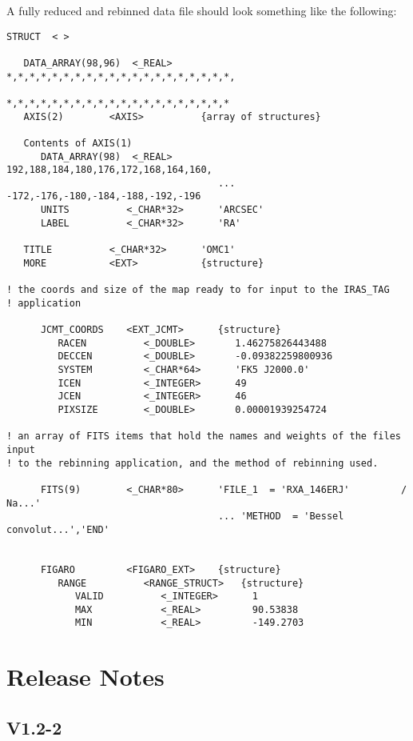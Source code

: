 \documentclass[twoside,11pt]{article}
\renewcommand{\_}{\texttt{\symbol{95}}}
\begin{document}
\goodbreak

A fully reduced and rebinned data file should look something like the
following:

\begin{small}
\begin{verbatim}
STRUCT  < >

   DATA_ARRAY(98,96)  <_REAL>     *,*,*,*,*,*,*,*,*,*,*,*,*,*,*,*,*,*,*,*,
                                  *,*,*,*,*,*,*,*,*,*,*,*,*,*,*,*,*,*,*,*
   AXIS(2)        <AXIS>          {array of structures}

   Contents of AXIS(1)
      DATA_ARRAY(98)  <_REAL>        192,188,184,180,176,172,168,164,160,
                                     ... -172,-176,-180,-184,-188,-192,-196
      UNITS          <_CHAR*32>      'ARCSEC'
      LABEL          <_CHAR*32>      'RA'

   TITLE          <_CHAR*32>      'OMC1'
   MORE           <EXT>           {structure}

! the coords and size of the map ready to for input to the IRAS_TAG
! application

      JCMT_COORDS    <EXT_JCMT>      {structure}
         RACEN          <_DOUBLE>       1.46275826443488
         DECCEN         <_DOUBLE>       -0.09382259800936
         SYSTEM         <_CHAR*64>      'FK5 J2000.0'
         ICEN           <_INTEGER>      49
         JCEN           <_INTEGER>      46
         PIXSIZE        <_DOUBLE>       0.00001939254724

! an array of FITS items that hold the names and weights of the files input 
! to the rebinning application, and the method of rebinning used.

      FITS(9)        <_CHAR*80>      'FILE_1  = 'RXA_146ERJ'         / Na...'
                                     ... 'METHOD  = 'Bessel convolut...','END'


      FIGARO         <FIGARO_EXT>    {structure}
         RANGE          <RANGE_STRUCT>   {structure}
            VALID          <_INTEGER>      1
            MAX            <_REAL>         90.53838
            MIN            <_REAL>         -149.2703
\end{verbatim}
\end{small}

\section*{Release Notes}

\subsection*{V1.2-2}
\end{document}
